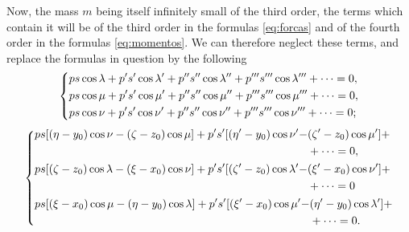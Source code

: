 \documentclass[leqno,openright,smallroyalvopaper,8pt,twoside,showtrims]{memoir}
\begin{document}
Now, the mass $m$ being itself infinitely small of the third order, the terms which contain it will be of the third order in the formulas \eqref{eq:forcas} and of the fourth order in the formulas \eqref{eq:momentos}. We can therefore neglect these terms, and replace the formulas in question by the following
\begin{equation}\label{eq:forcas2}
   \begin{dcases}
        ps\cos\lambda+p's'\cos\lambda'+p''s''\cos\lambda''+p'''s'''\cos\lambda'''+\cdots=0,\\
       ps\cos\mu+p's'\cos\mu'+p''s''\cos\mu''+p'''s'''\cos\mu'''+\cdots=0,\\
        ps\cos\nu+p's'\cos\nu'+p''s''\cos\nu''+p'''s'''\cos\nu'''+\cdots=0;
   \end{dcases}
 \end{equation}
 \begin{equation}\label{eq:momentos2}
   \begin{dcases}
   \begin{aligned}
        ps[(\eta-y_0)\cos\nu-(\zeta-z_0)\cos\mu]+p's'[(\eta'-y_0)\cos\nu'-&(\zeta'-z_0)\cos\mu']+\\
        &+\cdots=0,
   \end{aligned}\\
         \begin{aligned}
        ps[(\zeta-z_0)\cos\lambda-(\xi-x_0)\cos\nu]+p's'[(\zeta'-z_0)\cos\lambda'-&(\xi'-x_0)\cos\nu']+\\
        &+\cdots=0
   \end{aligned}\\
         \begin{aligned}
        ps[(\xi-x_0)\cos\mu-(\eta-y_0)\cos\lambda]+p's'[(\xi'-x_0)\cos\mu'-&(\eta'-y_0)\cos\lambda']+\\
        &+\cdots=0.
   \end{aligned}
   \end{dcases}
 \end{equation}
\end{document}
